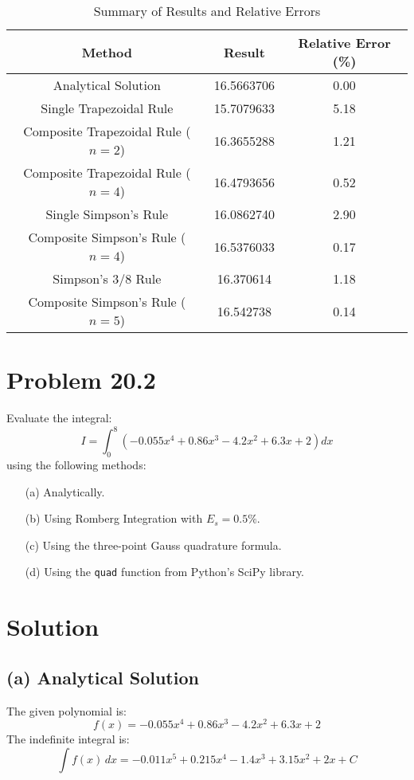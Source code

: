 \documentclass[11pt]{article}
\begin{document}
\begin{table}[H]
\centering
\begin{tabular}{|c|c|c|}
\hline
\textbf{Method} & \textbf{Result} & \textbf{Relative Error (\%)} \\
\hline
Analytical Solution & 16.5663706 & 0.00 \\
Single Trapezoidal Rule & 15.7079633 & 5.18 \\
Composite Trapezoidal Rule (\(n=2\)) & 16.3655288 & 1.21 \\
Composite Trapezoidal Rule (\(n=4\)) & 16.4793656 & 0.52 \\
Single Simpson's Rule & 16.0862740 & 2.90 \\
Composite Simpson's Rule (\(n=4\)) & 16.5376033 & 0.17 \\
Simpson's 3/8 Rule & 16.370614 & 1.18 \\
Composite Simpson's Rule (\(n=5\)) & 16.542738 & 0.14 \\
\hline
\end{tabular}
\caption{Summary of Results and Relative Errors}
\end{table}


\section*{Problem 20.2}
Evaluate the integral:
\[
I = \int_{0}^{8} \left(-0.055x^4 + 0.86x^3 - 4.2x^2 + 6.3x + 2\right) dx
\]
using the following methods:
\begin{enumerate}
    \item [(a)] Analytically.
    \item [(b)] Using Romberg Integration with \(E_s = 0.5\%\).
    \item [(c)] Using the three-point Gauss quadrature formula.
    \item [(d)] Using the \texttt{quad} function from Python’s SciPy library.
\end{enumerate}



\section*{Solution}

\subsection*{(a) Analytical Solution}

The given polynomial is:
\[
f(x) = -0.055x^4 + 0.86x^3 - 4.2x^2 + 6.3x + 2
\]
The indefinite integral is:
\[
\int f(x) \, dx = -0.011x^5 + 0.215x^4 - 1.4x^3 + 3.15x^2 + 2x + C
\]
\end{document}
